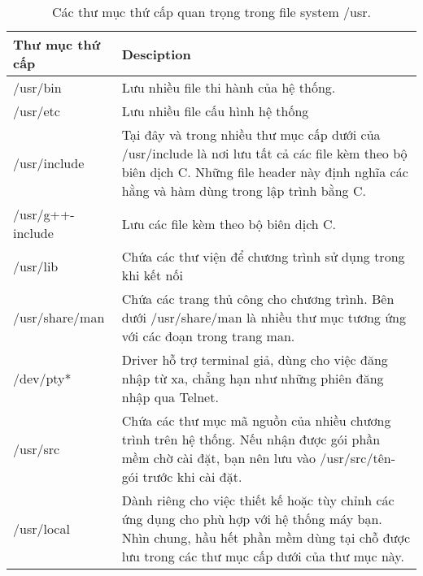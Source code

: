 \documentclass[twoside]{article}
\begin{document}
	\begin{table}[ht]
    	\centering
        \begin{tabular}{|m{5em}|m{35em}|} 
        	\hline
        	Thư mục thứ cấp & Desciption \\
        	\hline
        	/usr/bin & Lưu nhiều file thi hành của hệ thống.\\
        	\hline
        	/usr/etc & Lưu nhiều file cấu hình hệ thống \\
        	\hline
        	/usr/include & Tại đây và trong nhiều thư mục cấp dưới của /usr/include là nơi lưu tất cả các file kèm theo bộ biên dịch C. Những file header này định nghĩa các hằng và hàm dùng trong lập trình bằng C. \\
        	\hline
        	/usr/g++-include & Lưu các file kèm theo bộ biên dịch C.\\
        	\hline
        	/usr/lib &  Chứa các thư viện để chương trình sử dụng trong khi kết nối \\
        	\hline
        	/usr/share/man & Chứa các trang thủ công cho chương trình. Bên dưới /usr/share/man là nhiều thư mục tương ứng với các đoạn trong trang man.\\
        	\hline
        	/dev/pty* & Driver hỗ trợ terminal giả, dùng cho việc đăng nhập từ xa, chẳng hạn như những phiên đăng nhập qua Telnet.\\
        	\hline
        	/usr/src & Chứa các thư mục mã nguồn của nhiều chương trình trên hệ thống. Nếu nhận được gói phần mềm chờ cài đặt, bạn nên lưu vào /usr/src/tên-gói trước khi cài đặt.\\
        	\hline
        	/usr/local & Dành riêng cho việc thiết kế hoặc tùy chỉnh các ứng dụng cho phù hợp với hệ thống máy bạn. Nhìn chung, hầu hết phần mềm dùng tại chỗ được lưu trong các thư mục cấp dưới của thư mục này. \\
        	\hline
        \end{tabular}
        \caption{Các thư mục thứ cấp quan trọng trong file system /usr.}
	\end{table}
	
\end{document}
